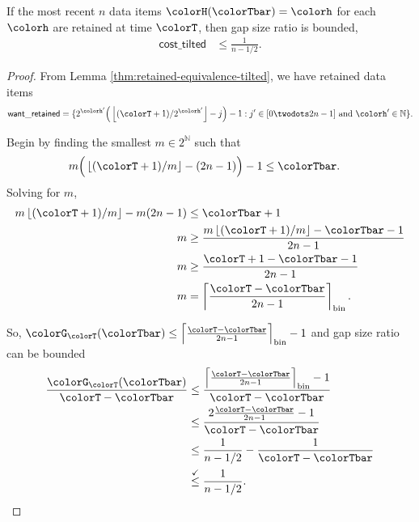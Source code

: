 \begin{lemma}
\label{thm:gap-size-ratio-tilted}
If the most recent $n$ data items $\colorH(\colorTbar) = \colorh$ for each \hv{} $\colorh$ are retained at time $\colorT$, then gap size ratio is bounded,
\begin{align*}
\mathsf{cost\_tilted}
&\leq
\frac{1}{n - 1/2}.
\end{align*}
\end{lemma}
\begin{proof}

From Lemma \ref{thm:retained-equivalence-tilted}, we have retained data items
\begin{align*}
\mathsf{want\_retained} =
\{
2^{\colorh'}\Big(\left\lfloor (\colorT + 1) / 2^{\colorh'} \right\rfloor - j\Big) - 1
  :
  j' \in [0 \twodots 2n-1]
  \text{ and }
  \colorh' \in \mathbb{N}
\}.
\end{align*}

Begin by finding the smallest $m \in 2^{\mathbb{N}}$ such that
\begin{align*}
m\Big( \left\lfloor (\colorT + 1)/m \right\rfloor - (2n - 1)\Big) - 1
&\leq
\colorTbar.
\end{align*}
Solving for $m$,
\begin{align*}
m \left\lfloor (\colorT + 1)/m \right\rfloor - m(2n - 1)
&\leq \colorTbar + 1\\
m
&\geq \frac{
m \left\lfloor (\colorT + 1)/m \right\rfloor - \colorTbar - 1
}{2n - 1}\\
m
&\geq \frac{
\colorT + 1 - \colorTbar - 1
}{2n - 1}\\
m
&= \left\lceil \frac{\colorT - \colorTbar}{2n - 1} \right\rceil_{\mathrm{bin}}.
\end{align*}

So, $\colorG_{\colorT}(\colorTbar) \leq \left\lceil \frac{\colorT - \colorTbar}{2n - 1} \right\rceil_{\mathrm{bin}} - 1$ and gap size ratio can be bounded
\begin{align*}
\frac{\colorG_{\colorT}(\colorTbar)}{\colorT - \colorTbar}
&\leq
\frac{
\left\lceil \frac{\colorT - \colorTbar}{2n - 1} \right\rceil_{\mathrm{bin}} - 1
}{
\colorT - \colorTbar
}\\
&\leq
\frac{
2\frac{\colorT - \colorTbar}{2n - 1}
 - 1
}{
\colorT - \colorTbar
}\\
&\leq
\frac{1
}{n - 1/2}
-
\frac{1
}{
\colorT - \colorTbar
}\\
&\stackrel{\checkmark}{\leq}
\frac{1}{n - 1/2}.
\end{align*}

\end{proof}
